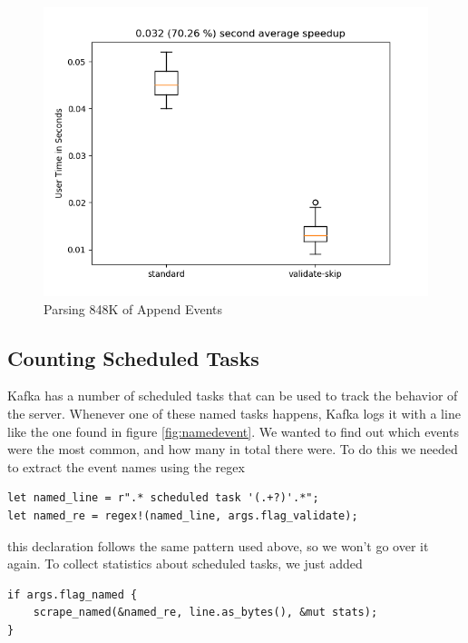 \begin{figure}
\caption{Parsing 848K of Append Events}
\label{fig:append:just:match}

\includegraphics{resources/append-just-match.png}
\end{figure}




\subsection{Counting Scheduled Tasks}

Kafka has a number of scheduled tasks that can be used to track
the behavior of the server. Whenever one of these named
tasks happens, Kafka logs it with a line like the one
found in figure \ref{fig:namedevent}. We wanted to find out which
events were the most common, and how many in total there were.
To do this we needed to extract the event names using the
regex

\begin{verbatim}
let named_line = r".* scheduled task '(.+?)'.*";
let named_re = regex!(named_line, args.flag_validate);
\end{verbatim}

this declaration follows the same pattern used above, so we
won't go over it again. To collect statistics about scheduled
tasks, we just added

\begin{verbatim}
if args.flag_named {
    scrape_named(&named_re, line.as_bytes(), &mut stats);
}
\end{verbatim}

